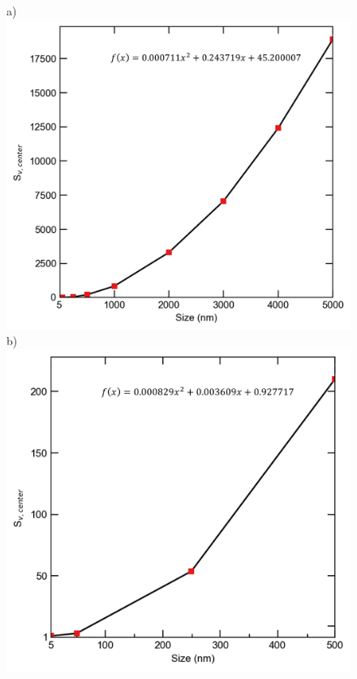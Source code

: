 \documentclass[utf8]{frontiersSCNS} %
\begin{document}
        \begin{figure}[h!]
        \centering
        a)\includegraphics[scale=0.55]{Fig8_a}
        \\
        \qquad
        b)\includegraphics[scale=0.55]{Fig8_b}

\end{figure}
\end{document}
